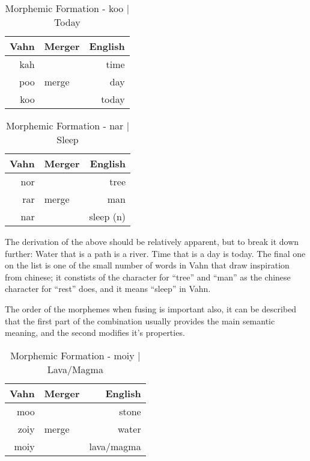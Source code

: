 \documentclass{article}
\begin{document}
\begin{table}[H]
    \centering
    \begin{tabular}{r|l||r}
        Vahn     & Merger & English  \\
        \hline\hline
        kah &       & time      \\
        poo & merge  & day    \\
        \hline \hline
        koo &        & today
    \end{tabular}
    \caption{Morphemic Formation - koo | Today}
    \label{Morphemic Formation - koo | Today}
\end{table}

\begin{table}[H]
    \centering
    \begin{tabular}{r|l||r}
        Vahn     & Merger & English  \\
        \hline\hline
        nor &       & tree      \\
        rar & merge  & man    \\
        \hline \hline
        nar &        & sleep (n)
    \end{tabular}
    \caption{Morphemic Formation - nar | Sleep}
    \label{Morphemic Formation - nar | Sleep}
\end{table}

The derivation of the above should be relatively apparent, but to break it down further: Water that
is a path is a river. Time that is a day is today. The final one on the list is one of the small
number of words in Vahn that draw inspiration from chinese; it constists of the character for
``tree'' and ``man'' as the chinese character for ``rest'' does, and it means ``sleep'' in Vahn.

The order of the morphemes when fusing is important also, it can be described that the first part of
the combination usually provides the main semantic meaning, and the second modifies it's properties.

\begin{table}[H]
    \centering
    \begin{tabular}{r|l||r}
        Vahn     & Merger & English  \\
        \hline\hline
        moo &       & stone \\
        zoiy & merge  & water\\
        \hline \hline
        moiy &        & lava/magma
    \end{tabular}
    \caption{Morphemic Formation - moiy | Lava/Magma}
    \label{Morphemic Formation - moiy | Lava/Magma}
\end{table}
\end{document}
